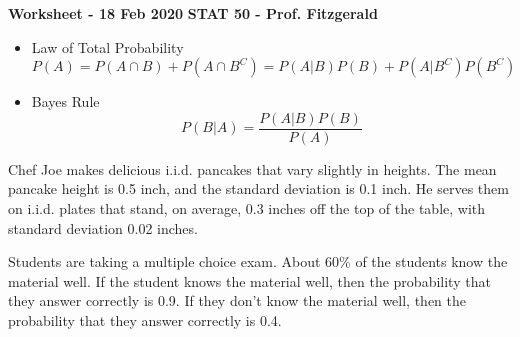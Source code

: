 \documentclass[12pt]{exam}
\begin{document}
\textbf{Worksheet - 18 Feb 2020}
\hfill
\textbf{STAT 50 - Prof. Fitzgerald}



\vspace{5mm}

\begin{itemize}

\item
Law of Total Probability
\[
P(A) = P(A \cap B) + P(A \cap B^C) = P(A | B) P(B) + P(A | B^C) P(B^C)
\]

\item
Bayes Rule
\[
P(B | A) = \frac{P(A | B) P(B)}{P(A)}
\]

\end{itemize}

\begin{questions}

\question
Chef Joe makes delicious i.i.d. pancakes that vary slightly in heights.
The mean pancake height is 0.5 inch, and the standard deviation is 0.1 inch.
He serves them on i.i.d. plates that stand, on average, 0.3 inches off the top of the table, with standard deviation 0.02 inches.

\vfill
\newpage
\question

Students are taking a multiple choice exam.
About 60\% of the students know the material well.
If the student knows the material well, then the probability that they answer correctly is 0.9.
If they don't know the material well, then the probability that they answer correctly is 0.4.


\end{questions}
\end{document}
